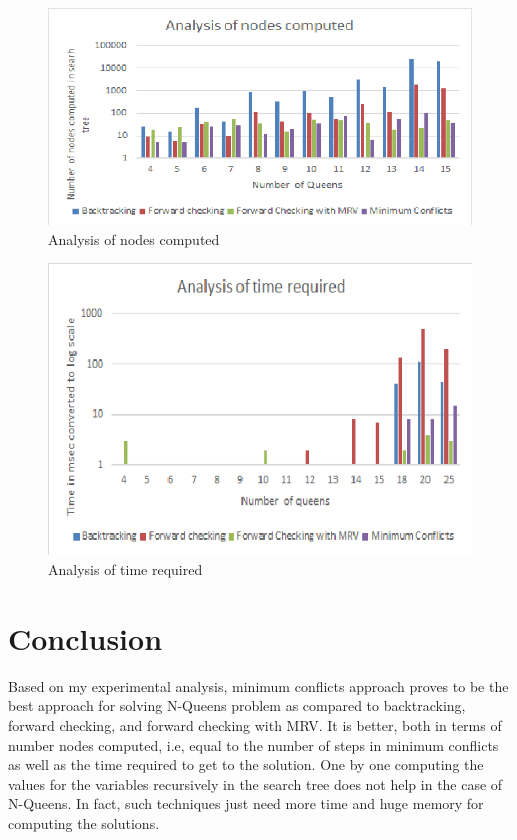 \documentclass[conference]{IEEEtran}
\begin{document}
\begin{figure}
\includegraphics[scale=0.51]{XLS_nodesComputed.png}
\caption{Analysis of nodes computed}
\label{Figure10}
\end{figure}


\begin{figure}
\includegraphics[scale=0.61]{XLS_time.png}
\caption{Analysis of time required}
\label{Figure11}
\end{figure}


\section{Conclusion}
Based on my experimental analysis, minimum conflicts approach proves to be the best approach for solving N-Queens problem as compared to backtracking, forward checking, and forward checking with MRV. It is better, both in terms of number nodes computed, i.e, equal to the number of steps in minimum conflicts as well as the time required to get to the solution. One by one computing the values for the variables recursively in the search tree does not help in the case of N-Queens. In fact, such techniques just need more time and huge memory for computing the solutions.
\end{document}
